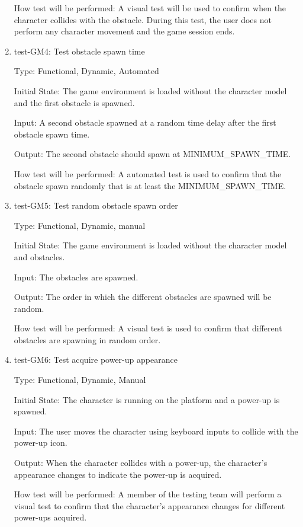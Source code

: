 \documentclass[12pt, titlepage]{article}
\begin{document}
\begin{enumerate}
How test will be performed: A visual test will be used to confirm when the character collides with the obstacle. During this test, the user does not perform any character movement and the game session ends.


\item{test-GM4: Test obstacle spawn time\\}

Type: Functional, Dynamic, Automated
					
Initial State: The game environment is loaded without the character model and the first obstacle is spawned.
					
Input: A second obstacle spawned at a random time delay after the first obstacle spawn time.  
					
Output: The second obstacle should spawn at MINIMUM\_SPAWN\_TIME. 
					
How test will be performed: A automated test is used to confirm that the obstacle spawn randomly that is at least the MINIMUM\_SPAWN\_TIME.

\item{test-GM5: Test random obstacle spawn order\\}

Type: Functional, Dynamic, manual
					
Initial State: The game environment is loaded without the character model and obstacles.
					
Input: The obstacles are spawned.  
					
Output: The order in which the different obstacles are spawned will be random. 
					
How test will be performed: A visual test is used to confirm that different obstacles are spawning in random order.

\item{test-GM6: Test acquire power-up appearance\\}

Type: Functional, Dynamic, Manual
					
Initial State: The character is running on the platform and a power-up is spawned.
					
Input: The user moves the character using keyboard inputs to collide with the power-up icon.

Output: When the character collides with a power-up, the character's appearance changes to indicate the power-up is acquired.
					
How test will be performed: A member of the testing team will perform a visual test to confirm that the character's appearance changes for different power-ups acquired.


\end{enumerate}
\end{document}
